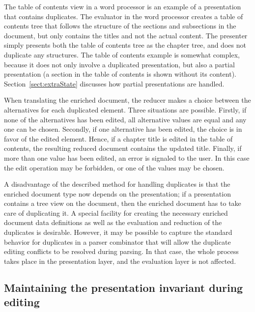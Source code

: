 The table of contents view in a word processor is an example of a presentation that contains duplicates. The evaluator in the word processor creates a table of contents tree that follows the structure of the sections and subsections in the document, but only contains the titles and not the actual content. The presenter simply presents both the table of contents tree as the chapter tree, and does not duplicate any structures. The table of contents example is somewhat complex, because it does not only involve a duplicated presentation, but also a partial presentation (a section in the table of contents is shown without its content). Section~\ref{sect:extraState} discusses how partial presentations are handled.

When translating the enriched document, the reducer makes a choice between the alternatives for each duplicated element. Three situations are possible. Firstly, if none of the alternatives has been edited, all alternative values are equal and any one can be chosen. Secondly, if one alternative has been edited, the choice is in favor of the edited element. Hence, if a chapter title is edited in the table of contents, the resulting reduced document contains the updated title. Finally, if more than one value has been edited, an error is signaled to the user. In this case the edit operation may be forbidden, or one of the values may be chosen.  

A disadvantage of the described method for handling duplicates is that the enriched document type now depends on the presentation; if a presentation contains a tree view on the document, then the enriched document has to take care of duplicating it. A special facility for creating the necessary enriched document data definitions as well as the evaluation and reduction of the duplicates is desirable. However, it may be possible to capture the standard behavior for duplicates in a parser combinator that will allow the duplicate editing conflicts to be resolved during parsing. In that case, the whole process takes place in the presentation layer, and the evaluation layer is not affected. 

%										
%									
\subsection{Maintaining the presentation invariant during editing}

